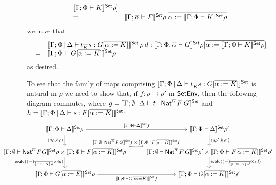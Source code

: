 \documentclass{lmcs}
\theoremstyle{plain}\newtheorem{satz}[thm]{Satz}
\renewcommand{\id}{\mathit{id}}
\begin{document}
{\begin{itemize}
\[\begin{array}{ll}
{    \llbracket{\Gamma;\Phi \vdash K}\rrbracket^{\mathsf{Set}}\rho}] \\
    =& \llbracket{\Gamma;
  \overline{\alpha} \vdash F}\rrbracket^{\mathsf{Set}}\rho[\overline{\alpha := \llbracket{\Gamma;\Phi \vdash
      K}\rrbracket^{\mathsf{Set}}\rho}] 
\end{array}\]
      we have that 
\[\begin{array}{ll}
  &\llbracket{\Gamma;\Phi \,|\, \Delta
  \vdash t_{\overline K} s: G [\overline{\alpha :=
      K}]}\rrbracket^{\mathsf{Set}}\,\rho\,d : \llbracket{\Gamma; \Phi ,\overline{\alpha} \vdash
  G}\rrbracket^{\mathsf{Set}}\rho[\overline{\alpha := \llbracket{\Gamma;\Phi \vdash K}\rrbracket^{\mathsf{Set}}\rho}]  \\
  =&\llbracket{\Gamma; \Phi \vdash G[\overline{\alpha := K}]}\rrbracket^{\mathsf{Set}}\rho
\end{array}\]
as desired.

\vspace*{0.1in}

To see that the family of maps comprising $\llbracket{\Gamma;\Phi \,|\,
  \Delta \vdash t_{\overline K} s: G [\overline{\alpha := K}]}\rrbracket^{\mathsf{Set}}$
is natural in $\rho$
we need to show that, if $f : \rho \to \rho'$ in $\mathsf{SetEnv}$, then the
following diagram commutes, where $g = \llbracket{\Gamma; \emptyset \,|\,
  \Delta \vdash t : \mathsf{Nat}^{\overline{\alpha}} \,F \,G}\rrbracket^{\mathsf{Set}}$ and $h =
\llbracket{\Gamma;\Phi \,|\, \Delta \vdash s: F [\overline{\alpha :=
      K}]}\rrbracket^{\mathsf{Set}}$:
{\footnotesize
\[\hspace*{-0.6in}
\begin{tikzcd}
\setsem{\Gamma;\Phi \vdash \Delta}\rho \ar[r, "{\setsem{\Gamma;\Phi
  \vdash \Delta}f}"] \ar[d, "{\langle g \rho, h \rho\rangle}"']
& \setsem{\Gamma;\Phi \vdash 
  \Delta}\rho' \ar[d, "{\langle g \rho', h \rho' \rangle}"]\\
\setsem{\Gamma;\emptyset \vdash \Nat^{\overline{\alpha}} \,F \,G}\rho
\times \setsem{\Gamma;\Phi \vdash F [\overline{\alpha := K}]}\rho
\ar[d, "{\eval \circ ((-)_{\overline{\sem{\Gamma;\Phi \vdash K}\rho}} \times
    \id)}"']
\ar[r, bend left = 5, "{\setsem{\Gamma;\emptyset\vdash
      \Nat^{\overline{\alpha}} \,F \,G}f\, \times\, \setsem{\Gamma;\Phi
      \vdash F [\overline{\alpha := K}]}f}"] &
\setsem{\Gamma;\emptyset \vdash \Nat^{\overline{\alpha}} \,F \,G}\rho'
\times \setsem{\Gamma;\Phi \vdash F [\overline{\alpha := K}]}\rho'
\ar[d, "{\eval \circ ((-)_{\overline{\sem{\Gamma;\Phi \vdash
          K}\rho'}} \times \id)}"] \\
\setsem{\Gamma;\Phi \vdash G [\overline{\alpha := K}]}\rho
\ar[r, "{\setsem{\Gamma;\Phi \vdash G [\overline{\alpha := K}]}f}"']
&
\setsem{\Gamma;\Phi \vdash G [\overline{\alpha := K}]}\rho'
\end{tikzcd}\]}


\end{itemize}}
\end{document}
